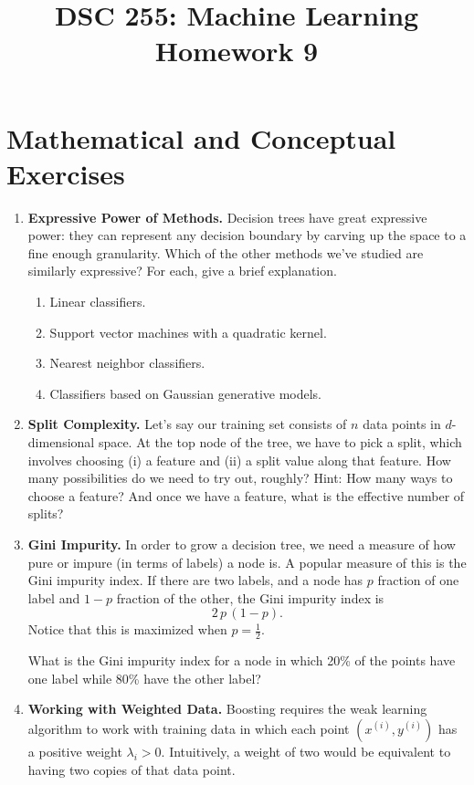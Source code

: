 \documentclass[11pt]{article}
\title{DSC 255: Machine Learning\\Homework 9}
\author{}
\date{}
\begin{document}
\maketitle

\section*{Mathematical and Conceptual Exercises}

\begin{enumerate}
  \item \textbf{Expressive Power of Methods.} Decision trees have great expressive power: they can represent any decision boundary by carving up the space to a fine enough granularity. Which of the other methods we’ve studied are similarly expressive? For each, give a brief explanation.
    \begin{enumerate}
      \item Linear classifiers.
      \item Support vector machines with a quadratic kernel.
      \item Nearest neighbor classifiers.
      \item Classifiers based on Gaussian generative models.
    \end{enumerate}

  \item \textbf{Split Complexity.} Let’s say our training set consists of $n$ data points in $d$-dimensional space. At the top node of the tree, we have to pick a split, which involves choosing (i) a feature and (ii) a split value along that feature. How many possibilities do we need to try out, roughly? Hint: How many ways to choose a feature? And once we have a feature, what is the effective number of splits?

  \item \textbf{Gini Impurity.} In order to grow a decision tree, we need a measure of how pure or impure (in terms of labels) a node is. A popular measure of this is the Gini impurity index. If there are two labels, and a node has $p$ fraction of one label and $1-p$ fraction of the other, the Gini impurity index is
  \[
    2\,p\,(1-p).
  \]
  Notice that this is maximized when $p = \tfrac12$.

  What is the Gini impurity index for a node in which 20\% of the points have one label while 80\% have the other label?

  \item \textbf{Working with Weighted Data.} Boosting requires the weak learning algorithm to work with training data in which each point $(x^{(i)},y^{(i)})$ has a positive weight $\lambda_i>0$. Intuitively, a weight of two would be equivalent to having two copies of that data point.


\end{enumerate}
\end{document}
